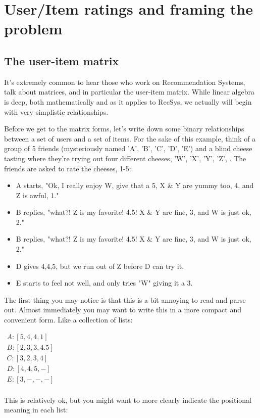 \chapter{User/Item ratings and framing the problem}
\label{ch:user-item}

\section{The user-item matrix}

It's extremely common to hear those who work on Recommendation Systems, talk about matrices, and in particular the user-item matrix. While linear algebra is deep, both mathematically and as it applies to RecSys, we actually will begin with very simplistic relationships. 

Before we get to the matrix forms, let's write down some binary relationships between a set of users and a set of items. For the sake of this example, think of a group of 5 friends (mysteriously named 'A', 'B', 'C', 'D', 'E') and a blind cheese tasting where they're trying out four different cheeses, 'W', 'X', 'Y', 'Z', . The friends are asked to rate the cheeses, 1-5:
\begin{itemize}
    \item \colorbox{almond}{\parbox{\textwidth-10pt}{
 A starts,  "Ok, I really enjoy W, give that a 5, X \& Y are yummy too, 4, and Z is awful, 1."
}}
    \item \colorbox{almond}{\parbox{\textwidth-10pt}{
 B replies, "what?! Z is my favorite! 4.5! X \& Y are fine, 3, and W is just ok, 2."
}}
    \item \colorbox{almond}{\parbox{\textwidth-10pt}{
 B replies, "what?! Z is my favorite! 4.5! X \& Y are fine, 3, and W is just ok, 2."
}}
    \item \colorbox{almond}{\parbox{\textwidth-10pt}{
 D gives 4,4,5, but we run out of Z before D can try it. 
}}
    \item \colorbox{almond}{\parbox{\textwidth-10pt}{
 E starts to feel not well, and only tries "W" giving it a 3.
}}
\end{itemize}

The first thing you may notice is that this is a bit annoying to read and parse out. Almost immediately you may want to write this in a more compact and convenient form. Like a collection of lists:

\begin{center}
\begin{math}
\begin{array}{cc}
    A:[5,4,4,1] \\
    B:[2,3,3,4.5] \\
    C:[3,2,3,4] \\
    D:[4,4,5,-] \\
    E:[3,-,-,-] \\
\end{array}
\end{math}
\end{center}
This is relatively ok, but you might want to more clearly indicate the positional meaning in each list:

